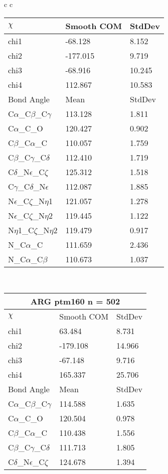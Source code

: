 \begin{longtable}{ c c }
\begin{tabular}{ l l l }
  $\chi$       & Smooth COM & StdDev \\ \midrule
  chi1 & -68.128 & 8.152 \\ 
  chi2 & -177.015 & 9.719 \\ 
  chi3 & -68.916 & 10.245 \\ 
  chi4 & 112.867 & 10.583 \\ \midrule
  Bond Angle   & Mean     & StdDev \\ \midrule
  C$\alpha$\_C$\beta$\_C$\gamma$ & 113.128 & 1.811\\
  C$\alpha$\_C\_O & 120.427 & 0.902\\
  C$\beta$\_C$\alpha$\_C & 110.057 & 1.759\\
  C$\beta$\_C$\gamma$\_C$\delta$ & 112.410 & 1.719\\
  C$\delta$\_N$\epsilon$\_C$\zeta$ & 125.312 & 1.518\\
  C$\gamma$\_C$\delta$\_N$\epsilon$ & 112.087 & 1.885\\
  N$\epsilon$\_C$\zeta$\_N$\eta$1 & 121.057 & 1.278\\
  N$\epsilon$\_C$\zeta$\_N$\eta$2 & 119.445 & 1.122\\
  N$\eta$1\_C$\zeta$\_N$\eta$2 & 119.479 & 0.917\\
  N\_C$\alpha$\_C & 111.659 & 2.436\\
  N\_C$\alpha$\_C$\beta$ & 110.673 & 1.037\\
  \bottomrule
  \end{tabular}
  \\
  \begin{tabular}{ l l l }
  \toprule
  \multicolumn{3}{c}{ARG \textbf{ptm160} n = 502} \\ \toprule
  $\chi$       & Smooth COM & StdDev \\ \midrule
  chi1 & 63.484 & 8.731 \\ 
  chi2 & -179.108 & 14.966 \\ 
  chi3 & -67.148 & 9.716 \\ 
  chi4 & 165.337 & 25.706 \\ \midrule
  Bond Angle   & Mean     & StdDev \\ \midrule
  C$\alpha$\_C$\beta$\_C$\gamma$ & 114.588 & 1.635\\
  C$\alpha$\_C\_O & 120.504 & 0.978\\
  C$\beta$\_C$\alpha$\_C & 110.438 & 1.556\\
  C$\beta$\_C$\gamma$\_C$\delta$ & 111.713 & 1.805\\
  C$\delta$\_N$\epsilon$\_C$\zeta$ & 124.678 & 1.394\\

\end{tabular}
\end{longtable}
